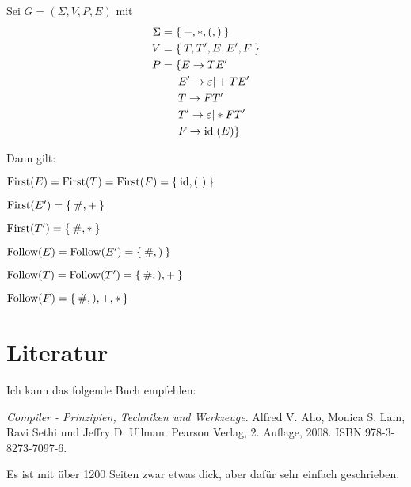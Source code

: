 \begin{beispiel}
    Sei $G = (\Sigma, V, P, E)$ mit
    \begin{align*}
        \Sigma &= \Set{+, *, (, )}\\
        V      &= \Set{T, T', E, E', F}\\
        P      &= \{ E  \rightarrow  T E'\\
               &\hphantom{= \{ } E' \rightarrow \varepsilon | +TE'\\
               &\hphantom{= \{ } T  \rightarrow FT'\\
               &\hphantom{= \{ } T' \rightarrow \varepsilon | *FT'\\
               &\hphantom{= \{ } F  \rightarrow \id | (E)\}
    \end{align*}

    Dann gilt:
    \begin{bspenum}
        \item $\operatorname{First}(E) = \operatorname{First}(T) = \operatorname{First}(F) = \Set{\textnormal{id}, (\ )}$
        \item $\operatorname{First}(E') = \Set{\#, +}$
        \item $\operatorname{First}(T') = \Set{\#, *}$
        \item $\operatorname{Follow}(E) = \operatorname{Follow}(E') = \Set{\#, )}$
        \item $\operatorname{Follow}(T) = \operatorname{Follow}(T') = \Set{\#, ), +}$
        \item $\operatorname{Follow}(F) = \Set{\#, ), +, *}$
    \end{bspenum}
\end{beispiel}

\section{Literatur}
Ich kann das folgende Buch empfehlen:

\textit{Compiler - Prinzipien, Techniken und Werkzeuge}. Alfred V. Aho, Monica S. Lam,
Ravi Sethi und Jeffry D. Ullman. Pearson Verlag, 2. Auflage, 2008. ISBN 978-3-8273-7097-6.

Es ist mit über 1200 Seiten zwar etwas dick, aber dafür sehr einfach geschrieben.

